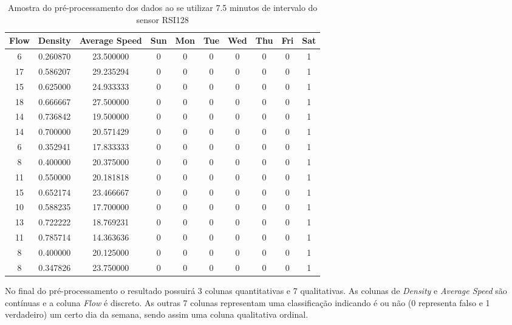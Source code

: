 \begin{table}[h]
    \begin{tabular}{cccccccccc}
    \toprule
    \multicolumn{1}{l}{\textbf{Flow}} & \multicolumn{1}{l}{\textbf{Density}} & \multicolumn{1}{l}{\textbf{Average Speed}} & \multicolumn{1}{l}{\textbf{Sun}} &
    \multicolumn{1}{l}{\textbf{Mon}} & \multicolumn{1}{l}{\textbf{Tue}} & \multicolumn{1}{l}{\textbf{Wed}} & \multicolumn{1}{l}{\textbf{Thu}} &
    \multicolumn{1}{l}{\textbf{Fri}} &
    \multicolumn{1}{l}{\textbf{Sat}} \\
    \midrule
     6 & 0.260870 & 23.500000 & 0 & 0 & 0 & 0 & 0 & 0 & 1 \\
    \midrule
    17 & 0.586207 & 29.235294 & 0 & 0 & 0 & 0 & 0 & 0 & 1 \\
    \midrule
    15 & 0.625000 & 24.933333 & 0 & 0 & 0 & 0 & 0 & 0 & 1 \\
    \midrule
    18 & 0.666667 & 27.500000 & 0 & 0 & 0 & 0 & 0 & 0 & 1 \\
    \midrule
    14 & 0.736842 & 19.500000 & 0 & 0 & 0 & 0 & 0 & 0 & 1 \\
    \midrule
    14 & 0.700000 & 20.571429 & 0 & 0 & 0 & 0 & 0 & 0 & 1 \\
    \midrule
     6 & 0.352941 & 17.833333 & 0 & 0 & 0 & 0 & 0 & 0 & 1 \\
    \midrule
     8 & 0.400000 & 20.375000 & 0 & 0 & 0 & 0 & 0 & 0 & 1 \\
    \midrule
    11 & 0.550000 & 20.181818 & 0 & 0 & 0 & 0 & 0 & 0 & 1 \\
    \midrule
    15 & 0.652174 & 23.466667 & 0 & 0 & 0 & 0 & 0 & 0 & 1 \\
    \midrule
    10 & 0.588235 & 17.700000 & 0 & 0 & 0 & 0 & 0 & 0 & 1 \\
    \midrule
    13 & 0.722222 & 18.769231 & 0 & 0 & 0 & 0 & 0 & 0 & 1 \\
    \midrule
    11 & 0.785714 & 14.363636 & 0 & 0 & 0 & 0 & 0 & 0 & 1 \\
    \midrule
     8 & 0.400000 & 20.125000 & 0 & 0 & 0 & 0 & 0 & 0 & 1 \\
    \midrule
     8 & 0.347826 & 23.750000 & 0 & 0 & 0 & 0 & 0 & 0 & 1 \\
    \bottomrule
    \end{tabular}
    \label{table:data_pre}
    \caption{Amostra do pré-processamento dos dados ao se utilizar 7.5 minutos de intervalo do sensor RSI128}
\end{table}

No final do pré-processamento o resultado possuirá 3 colunas quantitativas e 7 qualitativas. As colunas de \textit{Density} e \textit{Average Speed} são contínuas e a coluna \textit{Flow} é discreto. As outras 7 colunas representam uma classificação indicando é ou não (0 representa falso e 1 verdadeiro) um certo dia da semana, sendo assim uma coluna qualitativa ordinal.


